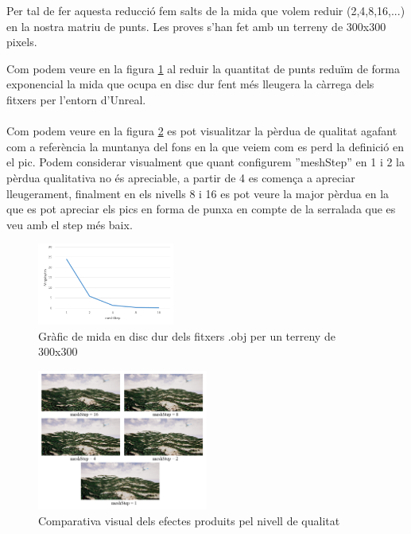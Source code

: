 \documentclass[10pt,a4paper,twocolumn,twoside]{article}
\begin{document}
Per tal de fer aquesta reducció fem salts de la mida que volem reduir (2,4,8,16,...) en la nostra matriu de punts. Les proves s'han fet amb un terreny de 300x300 pixels. 

Com podem veure en la figura \ref{fig-qualitatmegas} al reduir la quantitat de punts reduïm de forma exponencial la mida que ocupa en disc dur fent més lleugera la càrrega dels fitxers per l'entorn d'Unreal.
\\
\\
Com podem veure en la figura \ref{fig-qualityvisual} es pot visualitzar la pèrdua de qualitat agafant com a referència la muntanya del fons en la que veiem com es perd la definició en el pic. Podem considerar visualment que quant configurem ''meshStep'' en 1 i 2 la pèrdua qualitativa no és apreciable, a partir de 4 es comença a apreciar lleugerament, finalment en els nivells 8 i 16 es pot veure la major pèrdua en la que es pot apreciar els pics en forma de punxa en compte de la serralada que es veu amb el step més baix.

\begin{figure}[!h]
\centering
  	\includegraphics[width=0.4\textwidth]{qualitatmegas}
	\caption{Gràfic de mida en disc dur dels fitxers .obj per un terreny de 300x300}
	\label{fig-qualitatmegas}
\end{figure}

\begin{figure}[!h]
\centering
  	\includegraphics[width=0.5\textwidth]{quality/quality}
	\caption{Comparativa visual dels efectes produits pel nivell de qualitat}
	\label{fig-qualityvisual}
\end{figure}
\end{document}
